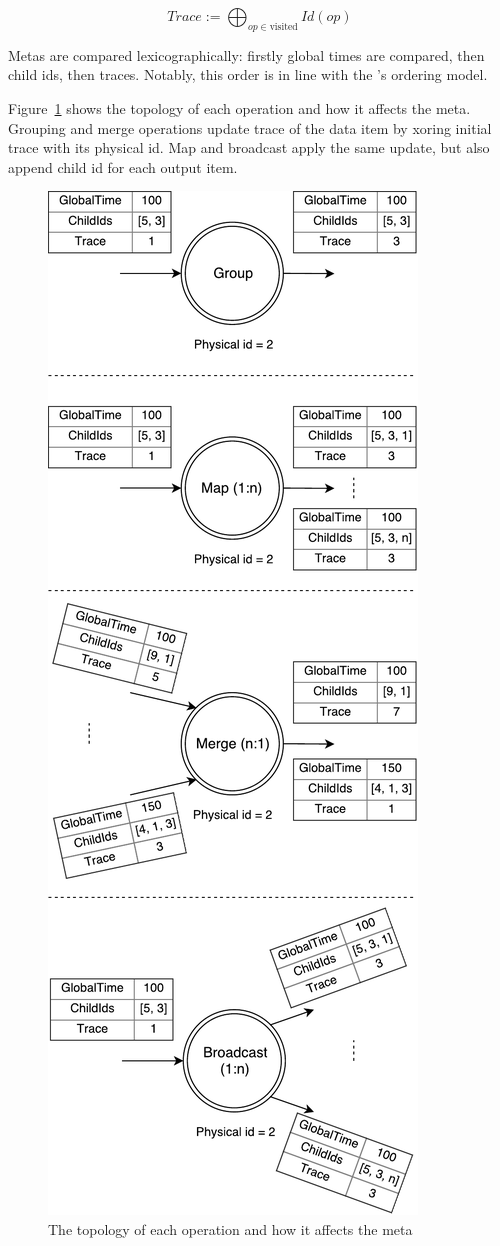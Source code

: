 \[Trace := \bigoplus_{op \in \text{visited}} Id(op)\]

Metas are compared lexicographically: firstly global times are compared, then child ids, then traces. Notably, this order is in line with the \FlameStream's ordering model.

Figure~\ref{logical-graph-ops-figure} shows the topology of each operation and how it affects the meta. Grouping and merge operations update trace of the data item by xoring initial trace with its physical id. Map and broadcast apply the same update, but also append child id for each output item.

\begin{figure}[htbp]
  \centering
  \includegraphics[scale=0.5]{pics/operations}
  \caption{The topology of each operation and how it affects the meta}
  \label {logical-graph-ops-figure}
\end{figure}

